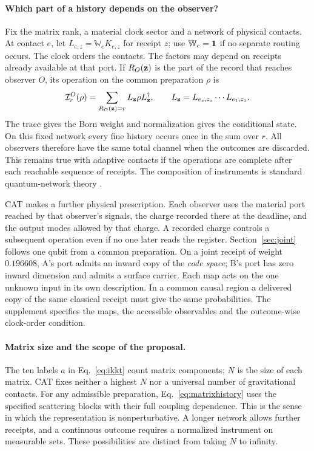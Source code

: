\paragraph{Which part of a history depends on the observer?}
Fix the matrix rank, a material clock sector and a network of physical contacts. At contact \(e\), let \(L_{e,z}=\mathbb W_e K_{e,z}\) for receipt \(z\); use \(\mathbb W_e=\mathbf 1\) if no separate routing occurs. The clock orders the contacts. The factors may depend on receipts already available at that port. If \(R_O({\bf z})\) is the part of the record that reaches observer \(O\), its operation on the common preparation \(\rho\) is
\begin{equation}
 \mathcal I^O_r(\rho)=\sum_{R_O({\bf z})=r} L_{\bf z}\rho L_{\bf z}^{\dagger},
 \qquad L_{\bf z}=L_{e_s,z_s}\cdots L_{e_1,z_1}.
 \label{eq:matrixhistory}
\end{equation}
The trace gives the Born weight and normalization gives the conditional state. On this fixed network every fine history occurs once in the sum over \(r\). All observers therefore have the same total channel when the outcomes are discarded. This remains true with adaptive contacts if the operations are complete after each reachable sequence of receipts. The composition of instruments is standard quantum-network theory \cite{networks}.

CAT makes a further physical prescription. Each observer uses the material port reached by that observer's signals, the charge recorded there at the deadline, and the output modes allowed by that charge. A recorded charge controls a subsequent operation even if no one later reads the register. Section~\ref{sec:joint} follows one qubit from a common preparation. On a joint receipt of weight \(0.196608\), A's port admits an inward copy of the \emph{code space}; B's port has zero inward dimension and admits a surface carrier. Each map acts on the one unknown input in its own description. In a common causal region a delivered copy of the same classical receipt must give the same probabilities. The supplement specifies the maps, the accessible observables and the outcome-wise clock-order condition.

\paragraph{Matrix size and the scope of the proposal.}
The ten labels \(a\) in Eq.~\eqref{eq:ikkt} count matrix components; \(N\) is the size of each matrix. CAT fixes neither a highest \(N\) nor a universal number of gravitational contacts. For any admissible preparation, Eq.~\eqref{eq:matrixhistory} uses the specified scattering blocks with their full coupling dependence. This is the sense in which the representation is nonperturbative. A longer network allows further receipts, and a continuous outcome requires a normalized instrument on measurable sets. These possibilities are distinct from taking \(N\) to infinity.

